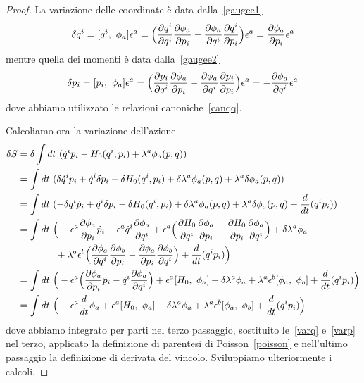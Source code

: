     \begin{proof}
    La variazione delle coordinate è data dalla~\eqref{gaugee1}
    \begin{equation} \label{varq}
        \delta q^i = [q^i, ~\phi_a] \epsilon^a = \Big(\frac{\partial q^i}{\partial q^i} \frac{\partial\phi_a}{\partial p_i} - \frac{\partial\phi_a}{\partial q^i} \frac{\partial q^i}{\partial p_i}\Big) \epsilon^a = \frac{\partial\phi_a}{\partial p_i} \epsilon^a 
    \end{equation}
    mentre quella dei momenti è data dalla~\eqref{gaugee2}
    \begin{equation} \label{varp}
        \delta p_i = [p_i, ~\phi_a] \epsilon^a = \Big(\frac{\partial p_i}{\partial q^i} \frac{\partial\phi_a}{\partial p_i} - \frac{\partial\phi_a}{\partial q^i} \frac{\partial p_i}{\partial p_i} \Big) \epsilon^a = - \frac{\partial\phi_a}{\partial q^i} \epsilon^a 
    \end{equation}
    dove abbiamo utilizzato le relazioni canoniche~\eqref{canqq}.

    Calcoliamo ora la variazione dell'azione
    \begin{equation*}
    \begin{aligned}
        \delta S & = \delta \int dt ~ (\dot q^i p_i - H_0(q^i, p_i) + \lambda^a \phi_a(p, q)) \\ & = \int dt ~ (\delta \dot q^i p_i + \dot q^i \delta p_i - \delta H_0(q^i, p_i) + \delta \lambda^a \phi_a(p, q) + \lambda^a \delta \phi_a(p, q)) \\ & = \int dt ~ (- \delta q^i \dot p_i + \dot q^i \delta p_i - \delta H_0(q^i, p_i) + \delta \lambda^a \phi_a(p, q) + \lambda^a \delta \phi_a(p, q) + \frac{d}{dt} (q^i p_i)) \\ & = \int dt ~ \Big (- \epsilon^a \frac{\partial\phi_a}{\partial p_i} \dot p_i - \epsilon^a \dot q^i \frac{\partial\phi_a}{\partial q^i} + \epsilon^a \Big (\frac{\partial H_0}{\partial q^i} \frac{\partial\phi_a}{\partial p_i} - \frac{\partial H_0}{\partial p_i} \frac{\partial\phi_a}{\partial q^i} \Big ) + \delta \lambda^a \phi_a \\ & \qquad \qquad + \lambda^a \epsilon^b \Big (\frac{\partial\phi_a}{\partial q^i} \frac{\partial\phi_b}{\partial p_i} - \frac{\partial\phi_a}{\partial p_i} \frac{\partial\phi_b}{\partial q^i} \Big) + \frac{d}{dt} (q^i p_i) \Big) \\ & = \int dt ~ \Big (- \epsilon^a \Big (\frac{\partial\phi_a}{\partial p_i} \dot p_i - \dot q^i \frac{\partial\phi_a}{\partial q^i} \Big ) + \epsilon^a [H_0, ~\phi_a] + \delta \lambda^a \phi_a + \lambda^a \epsilon^b [\phi_a, ~\phi_b] + \frac{d}{dt} (q^i p_i) \Big ) \\ & = \int dt ~ \Big (- \epsilon^a \frac{d}{dt} \phi_a + \epsilon^a [H_0, ~\phi_a] + \delta \lambda^a \phi_a + \lambda^a \epsilon^b [\phi_a, ~\phi_b] + \frac{d}{dt} (q^i p_i) \Big ) 
    \end{aligned}
    \end{equation*}
    dove abbiamo integrato per parti nel terzo passaggio, sostituito le~\eqref{varq} e~\eqref{varp} nel terzo, applicato la definizione di parentesi di Poisson~\eqref{poisson} e nell'ultimo passaggio la definizione di derivata del vincolo. Sviluppiamo ulteriormente i calcoli, 

\end{proof}
